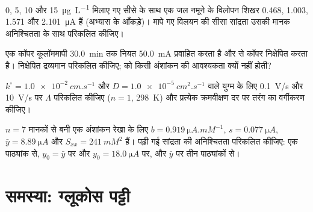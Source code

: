 \begin{exercise}[$\star\star$]\label{exo:b3:electrode-kinetics:9}
0, 5, 10 और \qty{15}{\micro g.L^{-1}} मिलाए गए सीसे के साथ एक जल नमूने के विलोपन शिखर
0.468, 1.003, 1.571 और \qty{2.101}{\micro A} हैं (अभ्यास के आँकड़े)। मापे गए विलयन की
सीसा सांद्रता उसकी मानक अनिश्चितता के साथ परिकलित कीजिए।
\end{exercise}

\begin{exercise}[$\star\star\star$]\label{exo:b3:electrode-kinetics:10}
एक कॉपर कूलॉममापी \qty{30.0}{min} तक नियत \qty{50.0}{mA} प्रवाहित करता है और  से
कॉपर निक्षेपित करता है। निक्षेपित द्रव्यमान परिकलित कीजिए;  को किसी
अंशांकन की आवश्यकता क्यों नहीं होती?
\end{exercise}

\begin{exercise}[$\star\star\star$]\label{exo:b3:electrode-kinetics:11}
$k^\circ = \qty{1.0e-2}{cm.s^{-1}}$ और $D = \qty{1.0e-5}{cm^2.s^{-1}}$ वाले युग्म के लिए \qty{0.1}{V/s}
और \qty{10}{V/s} पर $\Lambda$ परिकलित कीजिए ($n = 1$, \qty{298}{K}) और प्रत्येक क्रमवीक्षण दर पर तरंग का वर्गीकरण कीजिए।
\end{exercise}

\begin{exercise}[$\star\star\star$]\label{exo:b3:electrode-kinetics:12}
$n = 7$ मानकों से बनी एक अंशांकन रेखा के लिए $b = \qty{0.919}{\micro A.mM^{-1}}$, $s = \qty{0.077}{\micro A}$,
$\bar y = \qty{8.89}{\micro A}$ और $S_{xx} = \qty{241}{mM^2}$ हैं। पढ़ी गई सांद्रता की अनिश्चितता परिकलित कीजिए:
एक पाठ्यांक से, $y_0 = \bar y$ पर और $y_0 = \qty{18.0}{\micro A}$ पर, और $\bar y$ पर तीन पाठ्यांकों से।
\end{exercise}

\section{समस्या: ग्लूकोस पट्टी}

